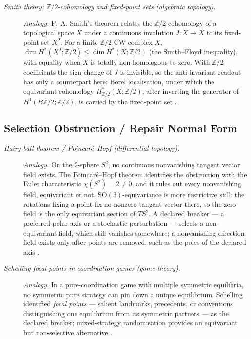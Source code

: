 \begin{description}
\item[\emph{Smith theory: \(\mathbb Z/2\)-cohomology and
fixed-point sets (algebraic topology).}] \textit{Analogy.}
P.~A. Smith's theorem relates the
\(\mathbb Z/2\)-cohomology of a topological space \(X\) under a
continuous involution \(J:X\to X\) to its fixed-point set
\(X^J\).  For a finite \(\mathbb Z/2\)-CW complex \(X\),
\(\dim H^*(X^J;\mathbb Z/2)\le\dim H^*(X;\mathbb Z/2)\) (the Smith--Floyd inequality), with
equality when \(X\) is totally non-homologous to zero.  With \(\mathbb Z/2\) coefficients the sign change of \(J\) is
invisible, so the  anti-invariant readout has only a
counterpart here: Borel localisation, under which the equivariant
cohomology \(H^*_{\mathbb Z/2}(X;\mathbb Z/2)\), after inverting the
generator of \(H^1(B\mathbb Z/2;\mathbb Z/2)\), is carried by the
fixed-point set
\citep{Smith1938TransformationsFinitePeriod}.
\end{description}
\endgroup

\subsection*{ Selection Obstruction / Repair Normal Form}
\begingroup\small
\begin{description}
\item[\emph{Hairy ball theorem / Poincar{\'e}--Hopf (differential
topology).}] \textit{Analogy.}
On the 2-sphere \(S^2\), no continuous nonvanishing tangent vector
field exists.  The Poincar{\'e}--Hopf theorem identifies the
obstruction with the Euler characteristic
\(\chi(S^2)=2\neq 0\), and it rules out every nonvanishing field,
equivariant or not.  \(\mathrm{SO}(3)\)-equivariance is more
restrictive still: the rotations fixing a point fix no nonzero
tangent vector there, so the zero field is the only equivariant
section of \(TS^2\).  A declared breaker --- a preferred polar axis
or a stochastic perturbation --- selects a non-equivariant field,
which still vanishes somewhere; a nonvanishing direction field exists
only after points are removed, such as the poles of the declared
axis
\citep{Poincare1885CourbesEquationsDifferentielles}.

\item[\emph{Schelling focal points in coordination games (game
theory).}] \textit{Analogy.}
In a pure-coordination game with multiple symmetric equilibria, no
symmetric pure strategy can pin down a unique equilibrium.  Schelling
identified \emph{focal points} --- salient landmarks, precedents,
or conventions distinguishing one equilibrium from its symmetric
partners --- as the  declared breaker; mixed-strategy
randomisation provides an equivariant but non-selective
alternative
\citep{Schelling1960StrategyConflict}.
\end{description}
\endgroup

